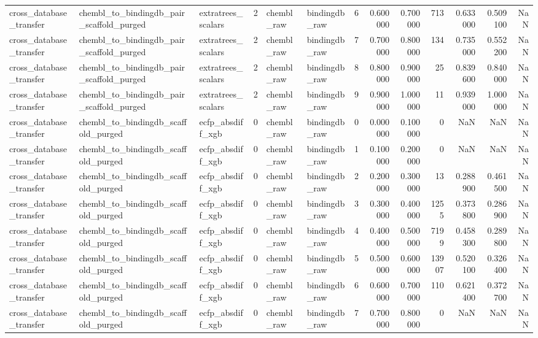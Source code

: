 \begin{longtable}{lllrllrrrrrrr}
cross\_database\_transfer & chembl\_to\_bindingdb\_pair\_scaffold\_purged & extratrees\_scalars & 2 & chembl\_raw & bindingdb\_raw & 6 & 0.600000 & 0.700000 & 713 & 0.633000 & 0.509100 & NaN \\
cross\_database\_transfer & chembl\_to\_bindingdb\_pair\_scaffold\_purged & extratrees\_scalars & 2 & chembl\_raw & bindingdb\_raw & 7 & 0.700000 & 0.800000 & 134 & 0.735000 & 0.552200 & NaN \\
cross\_database\_transfer & chembl\_to\_bindingdb\_pair\_scaffold\_purged & extratrees\_scalars & 2 & chembl\_raw & bindingdb\_raw & 8 & 0.800000 & 0.900000 & 25 & 0.839600 & 0.840000 & NaN \\
cross\_database\_transfer & chembl\_to\_bindingdb\_pair\_scaffold\_purged & extratrees\_scalars & 2 & chembl\_raw & bindingdb\_raw & 9 & 0.900000 & 1.000000 & 11 & 0.939000 & 1.000000 & NaN \\
cross\_database\_transfer & chembl\_to\_bindingdb\_scaffold\_purged & ecfp\_absdiff\_xgb & 0 & chembl\_raw & bindingdb\_raw & 0 & 0.000000 & 0.100000 & 0 & NaN & NaN & NaN \\
cross\_database\_transfer & chembl\_to\_bindingdb\_scaffold\_purged & ecfp\_absdiff\_xgb & 0 & chembl\_raw & bindingdb\_raw & 1 & 0.100000 & 0.200000 & 0 & NaN & NaN & NaN \\
cross\_database\_transfer & chembl\_to\_bindingdb\_scaffold\_purged & ecfp\_absdiff\_xgb & 0 & chembl\_raw & bindingdb\_raw & 2 & 0.200000 & 0.300000 & 13 & 0.288900 & 0.461500 & NaN \\
cross\_database\_transfer & chembl\_to\_bindingdb\_scaffold\_purged & ecfp\_absdiff\_xgb & 0 & chembl\_raw & bindingdb\_raw & 3 & 0.300000 & 0.400000 & 1255 & 0.373800 & 0.286900 & NaN \\
cross\_database\_transfer & chembl\_to\_bindingdb\_scaffold\_purged & ecfp\_absdiff\_xgb & 0 & chembl\_raw & bindingdb\_raw & 4 & 0.400000 & 0.500000 & 7199 & 0.458300 & 0.289800 & NaN \\
cross\_database\_transfer & chembl\_to\_bindingdb\_scaffold\_purged & ecfp\_absdiff\_xgb & 0 & chembl\_raw & bindingdb\_raw & 5 & 0.500000 & 0.600000 & 13907 & 0.520100 & 0.326400 & NaN \\
cross\_database\_transfer & chembl\_to\_bindingdb\_scaffold\_purged & ecfp\_absdiff\_xgb & 0 & chembl\_raw & bindingdb\_raw & 6 & 0.600000 & 0.700000 & 110 & 0.621400 & 0.372700 & NaN \\
cross\_database\_transfer & chembl\_to\_bindingdb\_scaffold\_purged & ecfp\_absdiff\_xgb & 0 & chembl\_raw & bindingdb\_raw & 7 & 0.700000 & 0.800000 & 0 & NaN & NaN & NaN \\

\end{longtable}
